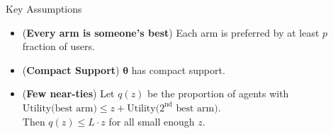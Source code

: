 \documentclass[serif]{beamer}
\begin{document}


\begin{frame}{Key Assumptions}
\begin{itemize}
\item (\textbf{Every arm is someone's best}) Each arm is preferred by at least $p$ fraction of users.
\vspace{0.2cm}
\item (\textbf{Compact Support}) $\bm{\theta}$ has compact support.
\vspace{0.2cm}
\item (\textbf{Few near-ties}) 
Let $q(z)$ be the proportion of agents with
$\text{Utility(best arm)} \le z + \text{Utility($2^{\mathrm{nd}}$ best arm)}$.\\
Then $q(z)\leq L\cdot z$ for all small enough $z$.
\end{itemize}

\end{frame}
\end{document}
